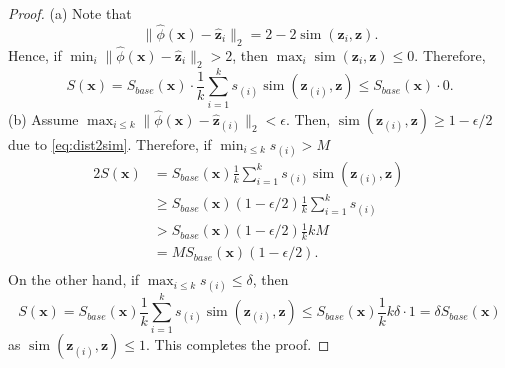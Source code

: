 \documentclass[10pt,twocolumn,letterpaper]{article}
\DeclareMathOperator{\simop}{sim}
\begin{document}
\begin{proof}
(a) Note that 
\begin{equation}
\label{eq:dist2sim}
 \lVert \widehat{\phi}(\mathbf{x}) - \widehat{\mathbf{z}}_i\rVert_2 =
2 - 2 \simop(\mathbf{z}_i, \mathbf{z}).
\end{equation}
Hence, if $\min_i \lVert \widehat{\phi}(\mathbf{x}) - \widehat{\mathbf{z}}_i\rVert_2 > 2$, then $\max_i \simop (\mathbf{z}_i, \mathbf{z}) \leq 0$. Therefore,
\begin{equation}
S(\mathbf{x}) = 
S_{base}(\mathbf{x}) \cdot \frac{1}{k} \sum_{i=1}^k s_{(i)} \simop (\mathbf{z}_{(i)}, \mathbf{z})
 \leq S_{base}(\mathbf{x}) \cdot 0.
\end{equation} 
(b) Assume $\max_{i \leq k} \lVert \widehat{\phi}(\mathbf{x}) - \widehat{\mathbf{z}}_{(i)}\rVert_2 < \epsilon$.
Then, $\simop (\mathbf{z}_{(i)}, \mathbf{z}) \geq 1 - \epsilon/2$ due to \eqref{eq:dist2sim}. Therefore, if $\min_{i \leq k} s_{(i)} > M$
\begin{alignat}{2}
S(\mathbf{x})  & = S_{base}(\mathbf{x}) \frac{1}{k} \sum_{i=1}^k s_{(i)} \simop (\mathbf{z}_{(i)}, \mathbf{z})  &&    \\
& \geq S_{base}(\mathbf{x})  (1 - \epsilon/2) \frac{1}{k} \sum_{i=1}^k s_{(i)}  &&   \\
& > S_{base}(\mathbf{x}) (1 - \epsilon/2) \frac{1}{k} kM  &&   \\
& =  MS_{base}(\mathbf{x})(1-\epsilon/2).  &&   \\
\end{alignat}
On the other hand, if $\max_{i \leq k} s_{(i)} \leq \delta$, then
\begin{equation}
S(\mathbf{x}) = S_{base}(\mathbf{x}) \frac{1}{k} \sum_{i=1}^k s_{(i)} \simop (\mathbf{z}_{(i)}, \mathbf{z})
\leq S_{base}(\mathbf{x}) \frac{1}{k} k \delta \cdot 1 = \delta S_{base}(\mathbf{x})
\end{equation}
as $\simop (\mathbf{z}_{(i)}, \mathbf{z}) \leq 1$. This completes the proof.
\end{proof}
\end{document}
